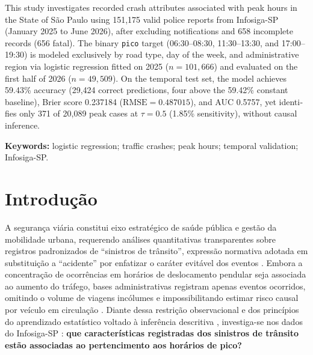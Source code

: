 \documentclass[
  article,
  12pt,
  oneside,
  a4paper,
  section=TITLE,
  english,
  brazil
]{abntex2}\usepackage[]{graphicx}\usepackage[]{xcolor}
\begin{document}
\vspace{0.25em}

\begin{SingleSpace}
\begin{otherlanguage}{english}
\noindent{}

\vspace{0.12em}
\noindent This study investigates recorded crash attributes associated with peak hours in the State of São Paulo using 151,175 valid police reports from Infosiga-SP (January 2025 to June 2026), after excluding notifications and 658 incomplete records (656 fatal). The binary \texttt{pico} target (06:30--08:30, 11:30--13:30, and 17:00--19:30) is modeled exclusively by road type, day of the week, and administrative region via logistic regression fitted on 2025 ($n = 101,666$) and evaluated on the first half of 2026 ($n = 49,509$). On the temporal test set, the model achieves 59.43\% accuracy (29,424 correct predictions, four above the 59.42\% constant baseline), Brier score 0.237184 ($\mathrm{RMSE} = 0.487015$), and AUC 0.5757, yet identifies only 371 of 20,089 peak cases at $\tau = 0.5$ (1.85\% sensitivity), without causal inference.\par

\vspace{0.12em}
\noindent\textbf{Keywords:} logistic regression; traffic crashes; peak hours; temporal validation; Infosiga-SP.
\end{otherlanguage}
\end{SingleSpace}

\textual
\pagestyle{abntchapfirst}
\OnehalfSpacing

\section{Introdução}

A segurança viária constitui eixo estratégico de saúde pública e gestão da mobilidade urbana, requerendo análises quantitativas transparentes sobre registros padronizados de ``sinistros de trânsito'', expressão normativa adotada em substituição a ``acidente'' por enfatizar o caráter evitável dos eventos \parencite{who2010,abnt10697}. Embora a concentração de ocorrências em horários de deslocamento pendular seja associada ao aumento do tráfego, bases administrativas registram apenas eventos ocorridos, omitindo o volume de viagens incólumes e impossibilitando estimar risco causal por veículo em circulação \parencite{who2010}. Diante dessa restrição observacional e dos princípios do aprendizado estatístico voltado à inferência descritiva \parencite{james2021}, investiga-se nos dados do Infosiga-SP \parencite{infosiga2026}: \textbf{que características registradas dos sinistros de trânsito estão associadas ao pertencimento aos horários de pico?}
\end{document}
